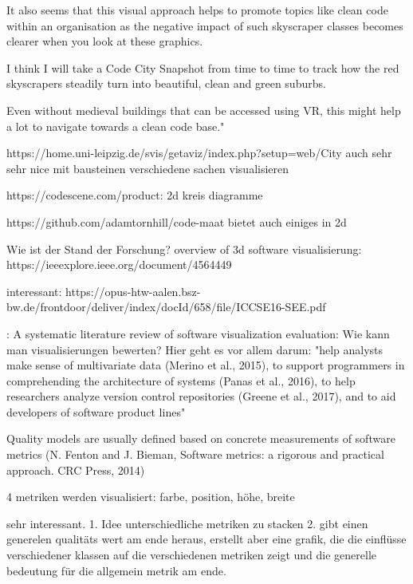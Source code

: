 It also seems that this visual approach helps to promote topics like clean code within an organisation as the negative impact of such skyscraper classes becomes clearer when you look at these graphics.

I think I will take a Code City Snapshot from time to time to track how the red skyscrapers steadily turn into beautiful, clean and green suburbs.

Even without medieval buildings that can be accessed using VR, this might help a lot to navigate towards a clean code base."


https://home.uni-leipzig.de/svis/getaviz/index.php?setup=web/City%
auch sehr sehr nice
mit bausteinen verschiedene sachen visualisieren


https://codescene.com/product:
2d kreis diagramme

https://github.com/adamtornhill/code-maat
bietet auch einiges in 2d

Wie ist der Stand der Forschung?
overview of 3d software visualisierung: https://ieeexplore.ieee.org/document/4564449

interessant: https://opus-htw-aalen.bsz-bw.de/frontdoor/deliver/index/docId/658/file/ICCSE16-SEE.pdf

\cite{MERINO2018165}:
A systematic literature review of software visualization evaluation:
Wie kann man visualisierungen bewerten?
Hier geht es vor allem darum: "help analysts make sense of multivariate data
(Merino et al., 2015), to support programmers in comprehending the
architecture of systems (Panas et al., 2016), to help researchers analyze
version control repositories (Greene et al., 2017), and to aid developers
of software product lines"


Quality models are usually defined based on concrete measurements of software metrics (N. Fenton and J. Bieman, Software metrics: a rigorous and practical approach. CRC Press, 2014)

4 metriken werden visualisiert: farbe, position, höhe, breite

sehr interessant.
1. Idee unterschiedliche metriken zu stacken
2. gibt einen generelen qualitäts wert am ende heraus, erstellt aber eine grafik, die die einflüsse verschiedener klassen auf die verschiedenen metriken zeigt und die generelle bedeutung für die allgemein metrik am ende.

